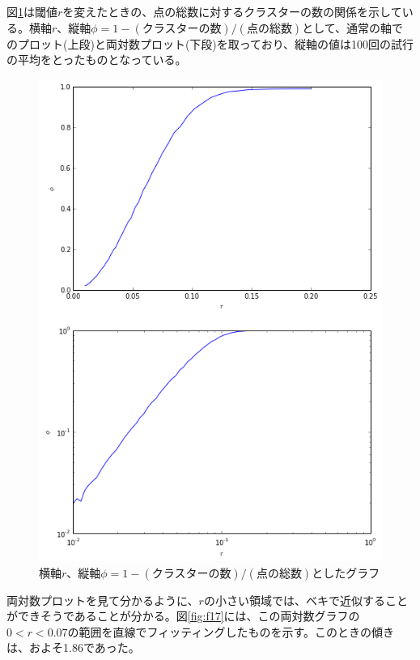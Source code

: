 図\ref{fig:f16}は閾値$r$を変えたときの、点の総数に対するクラスターの数の関係を示している。横軸$r$、縦軸$\phi = 1- (\text{クラスターの数})/(\text{点の総数})$として、通常の軸でのプロット(上段)と両対数プロット(下段)を取っており、縦軸の値は100回の試行の平均をとったものとなっている。
\begin{figure}[H]
    \begin{center}
        \includegraphics[width=12.5cm]{../img/r_phi_1.png}
        \caption{横軸$r$、縦軸$\phi = 1- (\text{クラスターの数})/(\text{点の総数})$としたグラフ}
        \label{fig:f16}
    \end{center}
\end{figure}
両対数プロットを見て分かるように、$r$の小さい領域では、ベキで近似することができそうであることが分かる。図\ref{fig:f17}には、この両対数グラフの$0<r<0.07$の範囲を直線でフィッティングしたものを示す。このときの傾きは、およそ1.86であった。
